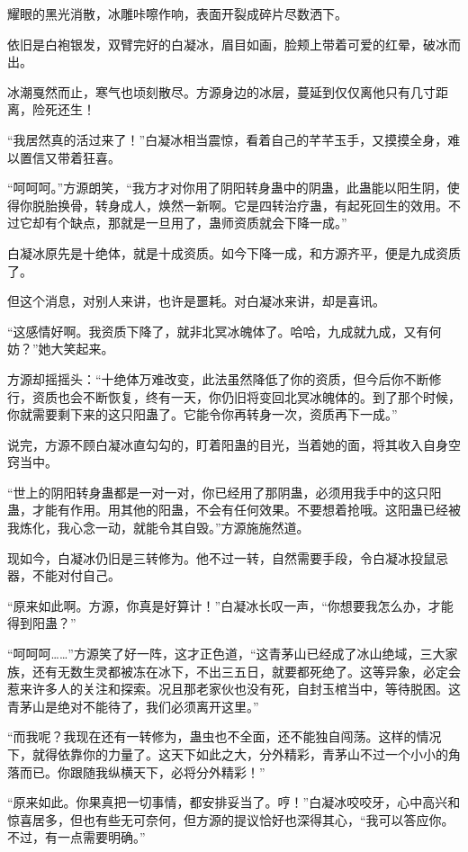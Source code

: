 \begin{this_body}
耀眼的黑光消散，冰雕咔嚓作响，表面开裂成碎片尽数洒下。

依旧是白袍银发，双臂完好的白凝冰，眉目如画，脸颊上带着可爱的红晕，破冰而出。

冰潮戛然而止，寒气也顷刻散尽。方源身边的冰层，蔓延到仅仅离他只有几寸距离，险死还生！

“我居然真的活过来了！”白凝冰相当震惊，看着自己的芊芊玉手，又摸摸全身，难以置信又带着狂喜。

“呵呵呵。”方源朗笑，“我方才对你用了阴阳转身蛊中的阴蛊，此蛊能以阳生阴，使得你脱胎换骨，转身成人，焕然一新啊。它是四转治疗蛊，有起死回生的效用。不过它却有个缺点，那就是一旦用了，蛊师资质就会下降一成。”

白凝冰原先是十绝体，就是十成资质。如今下降一成，和方源齐平，便是九成资质了。

但这个消息，对别人来讲，也许是噩耗。对白凝冰来讲，却是喜讯。

“这感情好啊。我资质下降了，就非北冥冰魄体了。哈哈，九成就九成，又有何妨？”她大笑起来。

方源却摇摇头：“十绝体万难改变，此法虽然降低了你的资质，但今后你不断修行，资质也会不断恢复，终有一天，你仍旧将变回北冥冰魄体的。到了那个时候，你就需要剩下来的这只阳蛊了。它能令你再转身一次，资质再下一成。”

说完，方源不顾白凝冰直勾勾的，盯着阳蛊的目光，当着她的面，将其收入自身空窍当中。

“世上的阴阳转身蛊都是一对一对，你已经用了那阴蛊，必须用我手中的这只阳蛊，才能有作用。用其他的阳蛊，不会有任何效果。不要想着抢哦。这阳蛊已经被我炼化，我心念一动，就能令其自毁。”方源施施然道。

现如今，白凝冰仍旧是三转修为。他不过一转，自然需要手段，令白凝冰投鼠忌器，不能对付自己。

“原来如此啊。方源，你真是好算计！”白凝冰长叹一声，“你想要我怎么办，才能得到阳蛊？”

“呵呵呵……”方源笑了好一阵，这才正色道，“这青茅山已经成了冰山绝域，三大家族，还有无数生灵都被冻在冰下，不出三五日，就要都死绝了。这等异象，必定会惹来许多人的关注和探索。况且那老家伙也没有死，自封玉棺当中，等待脱困。这青茅山是绝对不能待了，我们必须离开这里。”

“而我呢？我现在还有一转修为，蛊虫也不全面，还不能独自闯荡。这样的情况下，就得依靠你的力量了。这天下如此之大，分外精彩，青茅山不过一个小小的角落而已。你跟随我纵横天下，必将分外精彩！”

“原来如此。你果真把一切事情，都安排妥当了。哼！”白凝冰咬咬牙，心中高兴和惊喜居多，但也有些无可奈何，但方源的提议恰好也深得其心，“我可以答应你。不过，有一点需要明确。”


\end{this_body}
